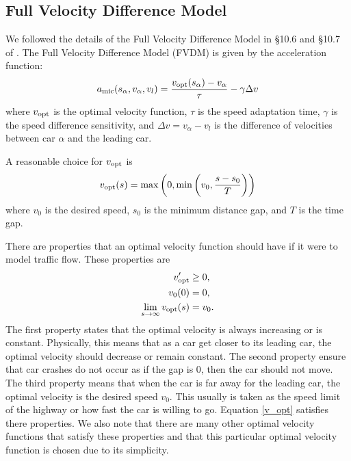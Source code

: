 \documentclass[12pt]{article}
\begin{document}
    \subsection{Full Velocity Difference Model}\label{ch3.1}
    We followed the details of the Full Velocity Difference Model in \S 10.6 and \S 10.7 of \cite{traffic}. The Full Velocity Difference Model (FVDM) is given by the acceleration function: 
    \begin{equation}\label{a_mic}
      a_{\rm mic}(s_\alpha,v_\alpha,v_l) = \frac{v_{\rm opt} (s_\alpha) - v_\alpha}{\tau} - \gamma \Delta v 
    \end{equation}
    where $v_{\rm opt}$ is the optimal velocity function, $\tau$ is the speed adaptation time, $\gamma$ is the speed difference sensitivity, and $\Delta v = v_\alpha - v_l$ is the difference of velocities between car $\alpha$ and the leading car.
    
    A reasonable choice for $v_{\rm opt}$ is 
    \begin{equation}\label{v_opt}
      v_{\rm opt} (s) = \max \left( 0, \min \left( v_0, \frac{s-s_0}{T} \right) \right)
    \end{equation}
    where $v_0$ is the desired speed, $s_0$ is the minimum distance gap, and $T$ is the time gap. 

    There are properties that an optimal velocity function should have if it were to model traffic flow. These properties are 
    \begin{align*}
      v_{\rm opt} ' &\geq 0, \\
      v_{\rm 0} (0) &= 0, \\
      \lim_{s \rightarrow \infty} v_{\rm opt} (s) &= v_0. 
    \end{align*}
    The first property states that the optimal velocity is always increasing or is constant. Physically, this means that as a car get closer to its leading car, the optimal velocity should decrease or remain constant. The second property ensure that car crashes do not occur as if the gap is $0$, then the car should not move. The third property means that when the car is far away for the leading car, the optimal velocity is the desired speed $v_0$. This usually is taken as the speed limit of the highway or how fast the car is willing to go. Equation \ref{v_opt} satisfies there properties. We also note that there are many other optimal velocity functions that satisfy these properties and that this particular optimal velocity function is chosen due to its simplicity.
    
\end{document}
